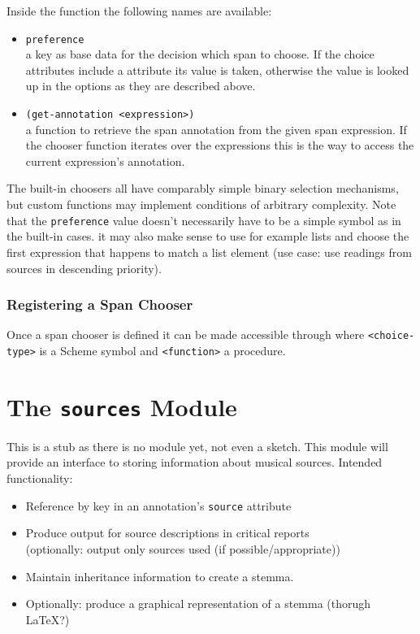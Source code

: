 \documentclass[]{ollmanual}
\providecommand{\tightlist}{%
  \setlength{\itemsep}{0pt}\setlength{\parskip}{0pt}}
\begin{document}
Inside the function the following names are available:

\begin{itemize}
\tightlist
\item
  \texttt{preference}~\\
  a key as base data for the decision which span to choose. If the
  choice attributes include a  attribute its value is
  taken, otherwise the value is looked up in the options as they are
  described above.
\item
  \texttt{(get-annotation\ \textless{}expression\textgreater{})}~\\
  a function to retrieve the span annotation from the given span
  expression. If the chooser function iterates over the expressions this
  is the way to access the current expression's annotation.
\end{itemize}

The built-in choosers all have comparably simple binary selection
mechanisms, but custom functions may implement conditions of arbitrary
complexity. Note that the \texttt{preference} value doesn't necessarily
have to be a simple symbol as in the built-in cases. it may also make
sense to use for example lists and choose the first expression that
happens to match a list element (use case: use readings from sources in
descending priority).

\hypertarget{registering-a-span-chooser}{%
\subsubsection{Registering a Span
Chooser}\label{registering-a-span-chooser}}

Once a span chooser is defined it can be made accessible through
 where
\texttt{\textless{}choice-type\textgreater{}} is a Scheme symbol and
\texttt{\textless{}function\textgreater{}} a procedure.

\hypertarget{the-sources-module}{%
\section{\texorpdfstring{The \texttt{sources}
Module}{The sources Module}}\label{the-sources-module}}

This is a stub as there is no  module yet,
not even a sketch. This module will provide an interface to storing
information about musical sources. Intended functionality:

\begin{itemize}
\tightlist
\item
  Reference by key in an annotation's \texttt{source} attribute
\item
  Produce output for source descriptions in critical reports\\
  (optionally: output only sources used (if possible/appropriate))
\item
  Maintain inheritance information to create a stemma.
\item
  Optionally: produce a graphical representation of a stemma (thorugh
  \LaTeX?)
\end{itemize}

\printindex
{}
\end{document}
